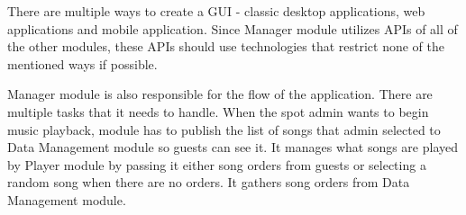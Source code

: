 \par
There are multiple ways to create a GUI - classic desktop applications, web applications and mobile application. Since Manager module utilizes APIs of all of the other modules, these APIs should use technologies that restrict none of the mentioned ways if possible.
\par
Manager module is also responsible for the flow of the application. There are multiple tasks that it needs to handle. When the spot admin wants to begin music playback, module has to publish the list of songs that admin selected to Data Management module so guests can see it. It manages what songs are played by Player module by passing it either song orders from guests or selecting a random song when there are no orders. It gathers song orders from Data Management module.

















